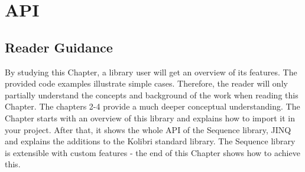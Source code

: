 \chapter{API} %
\label{chap:api}

\section*{Reader Guidance} %
\label{sec:api_reader_guidance}
By studying this Chapter, a library user will get an overview of its features.
The provided code examples illustrate simple cases. Therefore, the reader will
only partially understand the concepts and background of the work when reading
this Chapter. The chapters 2-4 provide a much deeper conceptual
understanding. %
The Chapter starts with an overview of this library and explains how to import
it in your project. After that, it shows the whole API of the Sequence library,
JINQ and explains the additions to the Kolibri standard library. The Sequence
library is extensible with custom features - the end of this Chapter shows how
to achieve this.








